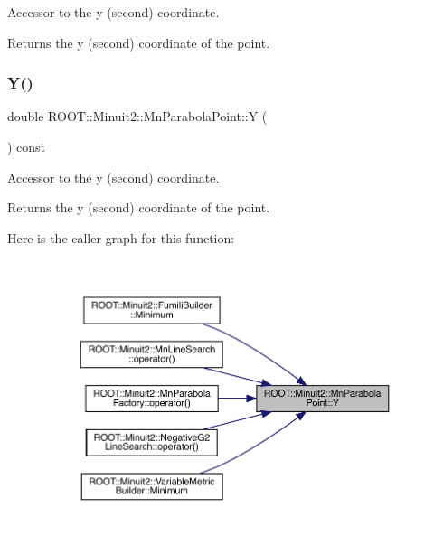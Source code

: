 Accessor to the y (second) coordinate.

\begin{DoxyReturn}{Returns}
the y (second) coordinate of the point. 
\end{DoxyReturn}
\mbox{\label{classROOT_1_1Minuit2_1_1MnParabolaPoint_abc0c0fa35bdee10c52229aadef4e20be}} 
\subsubsection{\texorpdfstring{Y()}{Y()}\hspace{0.1cm}{\footnotesize\ttfamily [2/3]}}
{\footnotesize\ttfamily double R\+O\+O\+T\+::\+Minuit2\+::\+Mn\+Parabola\+Point\+::Y (\begin{DoxyParamCaption}{ }\end{DoxyParamCaption}) const\hspace{0.3cm}{\ttfamily [inline]}}

Accessor to the y (second) coordinate.

\begin{DoxyReturn}{Returns}
the y (second) coordinate of the point. 
\end{DoxyReturn}
Here is the caller graph for this function\+:
\nopagebreak
\begin{figure}[H]
\begin{center}
\leavevmode
\includegraphics[width=350pt]{de/de5/classROOT_1_1Minuit2_1_1MnParabolaPoint_abc0c0fa35bdee10c52229aadef4e20be_icgraph}
\end{center}
\end{figure}
\mbox{\label{classROOT_1_1Minuit2_1_1MnParabolaPoint_abc0c0fa35bdee10c52229aadef4e20be}} 
